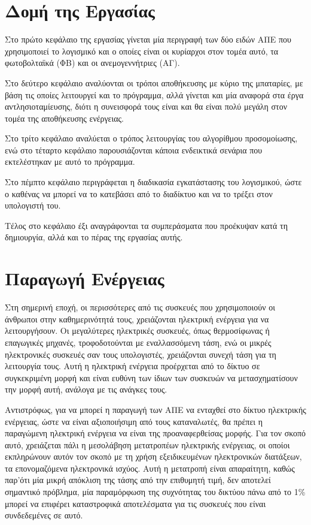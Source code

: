 \documentclass[12pt]{report}
\begin{document}
\chapter*{Δομή της Εργασίας}
Στο πρώτο κεφάλαιο της εργασίας γίνεται μία περιγραφή των δύο ειδών ΑΠΕ που χρησιμοποιεί το λογισμικό και ο οποίες είναι οι κυρίαρχοι στον τομέα αυτό, τα φωτοβολταϊκά (ΦΒ) και οι ανεμογεννήτριες (ΑΓ).

Στο δεύτερο κεφάλαιο αναλύονται οι τρόποι αποθήκευσης με κύριο της μπαταρίες, με βάση τις οποίες λειτουργεί και το πρόγραμμα, αλλά γίνεται και μία αναφορά στα έργα αντλησιοταμίευσης, διότι η συνεισφορά τους είναι και θα είναι
πολύ μεγάλη στον τομέα της αποθήκευσης ενέργειας.

Στο τρίτο κεφάλαιο αναλύεται ο τρόπος λειτουργίας του αλγορίθμου προσομοίωσης, ενώ στο τέταρτο κεφάλαιο παρουσιάζονται κάποια ενδεικτικά σενάρια που εκτελέστηκαν με αυτό το πρόγραμμα.

Στο πέμπτο κεφάλαιο περιγράφεται η διαδικασία εγκατάστασης του λογισμικού, ώστε ο καθένας να μπορεί να το κατεβάσει από το διαδίκτυο και να το τρέξει στον υπολογιστή του.

Τέλος στο κεφάλαιο έξι αναγράφονται τα συμπεράσματα που προέκυψαν κατά τη δημιουργία, αλλά και το πέρας της εργασίας αυτής.

\chapter{Παραγωγή Ενέργειας}
Στη σημερινή εποχή, οι περισσότερες από τις συσκευές που χρησιμοποιούν οι άνθρωποι στην καθημερινότητά τους, χρειάζονται ηλεκτρική ενέργεια για να λειτουργήσουν. Οι μεγαλύτερες ηλεκτρικές συσκευές, όπως θερμοσίφωνας ή επαγωγικές
μηχανές, τροφοδοτούνται με εναλλασσόμενη τάση, ενώ οι μικρές ηλεκτρονικές συσκευές σαν τους υπολογιστές, χρειάζονται συνεχή τάση για τη λειτουργία τους. Αυτή η ηλεκτρική ενέργεια προέρχεται από το δίκτυο σε συγκεκριμένη μορφή
{} και είναι ευθύνη των ίδιων των συσκευών να μετασχηματίσουν την μορφή αυτή, ανάλογα με τις ανάγκες τους.

Αντιστρόφως, για να μπορεί η παραγωγή των ΑΠΕ να ενταχθεί στο δίκτυο ηλεκτρικής ενέργειας, ώστε να είναι αξιοποιήσιμη από τους καταναλωτές, θα πρέπει η παραγώμενη ηλεκτρική ενέργεια να είναι της προαναφερθείσας μορφής. Για τον σκοπό 
αυτό, χρειάζεται πάλι η μεσολάβηση μετατροπέων ηλεκτρικής ενέργειας, οι οποίοι εκπληρώνουν αυτόν τον σκοπό με τη χρήση εξειδικευμένων ηλεκτρονικών διατάξεων, τα επονομαζόμενα ηλεκτρονικά ισχύος. Αυτή 
η μετατροπή είναι απαραίτητη, καθώς παρ'ότι μία μικρή απόκλιση της τάσης από την επιθυμητή τιμή, δεν αποτελεί σημαντικό πρόβλημα, μία παραμόρφωση της συχνότητας του δικτύου πάνω από το 1\% μπορεί να επιφέρει καταστροφικά αποτελέσματα
για τις συσκευές που είναι συνδεδεμένες σε αυτό. 
\end{document}
